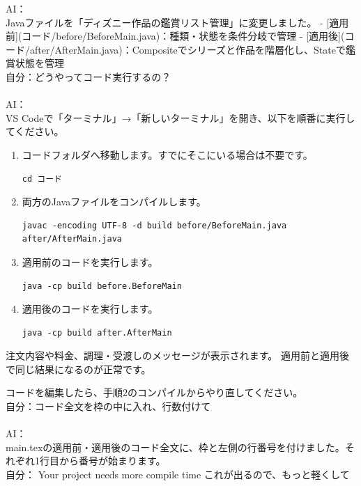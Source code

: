 \documentclass[dvipdfmx,a4paper,11pt]{jsarticle}
\begin{document}
AI：\\Javaファイルを「ディズニー作品の鑑賞リスト管理」に変更しました。
- [適用前](コード/before/BeforeMain.java)：種類・状態を条件分岐で管理
- [適用後](コード/after/AfterMain.java)：Compositeでシリーズと作品を階層化し、Stateで鑑賞状態を管理\\[7zw]
自分：どうやってコード実行するの？\\\\

\noindent AI：\\
VS Codeで「ターミナル」→「新しいターミナル」を開き、以下を順番に実行してください。

\begin{enumerate}
\item コードフォルダへ移動します。すでにそこにいる場合は不要です。
\begin{Verbatim}
cd コード
\end{Verbatim}

\item 両方のJavaファイルをコンパイルします。
\begin{Verbatim}
javac -encoding UTF-8 -d build before/BeforeMain.java after/AfterMain.java
\end{Verbatim}

\item 適用前のコードを実行します。
\begin{Verbatim}
java -cp build before.BeforeMain
\end{Verbatim}

\item 適用後のコードを実行します。
\begin{Verbatim}
java -cp build after.AfterMain
\end{Verbatim}
\end{enumerate}

注文内容や料金、調理・受渡しのメッセージが表示されます。
適用前と適用後で同じ結果になるのが正常です。

コードを編集したら、手順2のコンパイルからやり直してください。\\[7zw]

自分：コード全文を枠の中に入れ、行数付けて\\\\

AI：\\
main.texの適用前・適用後のコード全文に、枠と左側の行番号を付けました。それぞれ1行目から番号が始まります。\\[7zw]

自分： Your project needs more compile time
これが出るので、もっと軽くして\\\\
\end{document}
